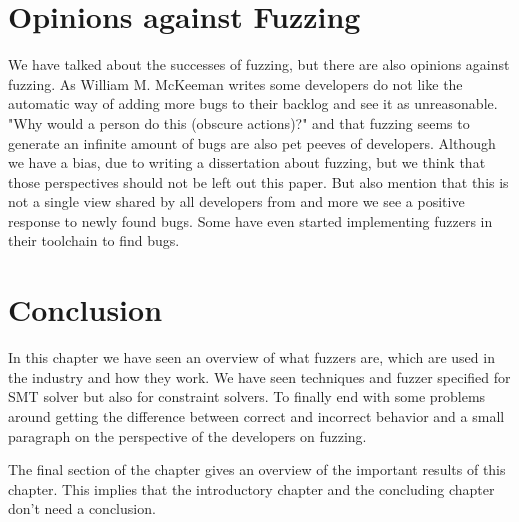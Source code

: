 \section{Opinions against Fuzzing}
\label{fuzzing:OpinionsAgainstFuzzing}
We have talked about the successes of fuzzing, but there are also opinions against fuzzing. As William M. McKeeman \cite{39differentialTesting} writes some developers do not like the automatic way of adding more bugs to their backlog and see it as unreasonable. "Why would a person do this (obscure actions)?" and that fuzzing seems to generate an infinite amount of bugs are also pet peeves of developers. 
Although we have a bias, due to writing a dissertation about fuzzing, but we think that those perspectives should not be left out this paper. But also mention that this is not a single view shared by all developers from \cite{43YinYang, 42FalconFuzzingConfigurationSettingsAndNormal, 47zhang2019finding} and more we see a positive response to newly found bugs. Some have even started implementing fuzzers \cite{44Stringfuzz} in their toolchain to find bugs.

\section{Conclusion}
\label{fuzzing:conclusion}
In this chapter we have seen an overview of what fuzzers are, which are used in the industry and how they work. We have seen techniques and fuzzer specified for SMT solver but also for constraint solvers. To finally end with some problems around getting the difference between correct and incorrect behavior and a small paragraph on the perspective of the developers on fuzzing.

The final section of the chapter gives an overview of the important results of this chapter. This implies that the introductory chapter and the concluding chapter don't need a conclusion.


